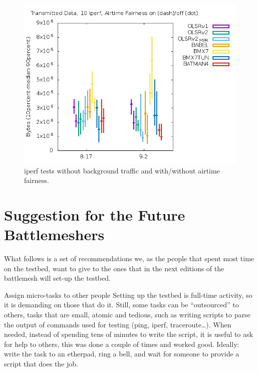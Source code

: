 \documentclass[10pt,onecolumn]{paper}
\begin{document}
\begin{figure}[!htb]
  \centering
    \includegraphics[width=.9\linewidth]{images/failure_test_iperf_10runs-IPv6_noairfair.png}
    \caption{iperf tests without background traffic and with/without airtime fairness.}
  \label{fig:iperfnofair}
\end{figure}

\FloatBarrier
\section{Suggestion for the Future Battlemeshers}

What follows is a set of recommendations we, as the people that spent most time
on the testbed, want to give to the ones that in the next editions of the
battlemesh will set-up the testbed. 


\begin{mybox}{Assign micro-tasks to other people}
    Setting up the testbed is full-time activity, so it is demanding on those
    that do it. Still, some tasks can be ``outsourced'' to others, tasks that
    are small, atomic and tedious, such as writing scripts to parse the output
    of commands  used for testing (ping, iperf, traceroute\ldots). When needed,
    instead of spending tens of minutes to write the script, it is useful to ask
    for help to others, this was done a couple of times and worked good.
    Ideally: write the task to an etherpad, ring a bell, and wait for someone to
    provide a script that does the job.
\end{mybox}
\end{document}

